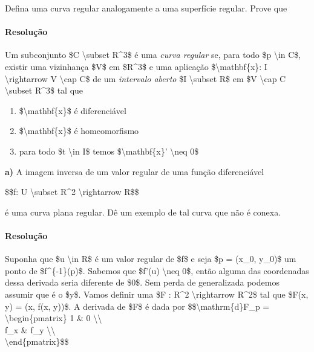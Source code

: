 Defina uma curva regular analogamente a uma superfície regular. Prove
que

\hypertarget{resoluuxe7uxe3o-9}{%
\paragraph{Resolução}\label{resoluuxe7uxe3o-9}}

Um subconjunto \$C \textbackslash{}subset R\^{}3\$ é uma \emph{curva
regular} se, para todo \$p \textbackslash{}in C\$, existir uma
vizinhança \$V\$ em \$R\^{}3\$ e uma aplicação
\$\textbackslash{}mathbf\{x\}: I \textbackslash{}rightarrow V
\textbackslash{}cap C\$ de um \emph{intervalo aberto} \$I
\textbackslash{}subset R\$ em \$V \textbackslash{}cap C
\textbackslash{}subset R\^{}3\$ tal que

\begin{enumerate}
\tightlist
\item
  \$\textbackslash{}mathbf\{x\}\$ é diferenciável
\item
  \$\textbackslash{}mathbf\{x\}\$ é homeomorfismo
\item
  para todo \$t \textbackslash{}in I\$ temos
  \$\textbackslash{}mathbf\{x\}' \textbackslash{}neq 0\$
\end{enumerate}

\textbf{a)} A imagem inversa de um valor regular de uma função
diferenciável

\$\$f: U \textbackslash{}subset R\^{}2 \textbackslash{}rightarrow R\$\$

é uma curva plana regular. Dê um exemplo de tal curva que não é conexa.

\hypertarget{resoluuxe7uxe3o-10}{%
\paragraph{Resolução}\label{resoluuxe7uxe3o-10}}

Suponha que \$u \textbackslash{}in R\$ é um valor regular de \$f\$ e
seja \$p = (x\_0, y\_0)\$ um ponto de \$f\^{}\{-1\}(p)\$. Sabemos que
\$f'(u) \textbackslash{}neq 0\$, então alguma das coordenadas dessa
derivada seria diferente de \$0\$. Sem perda de generalizada podemos
assumir que é o \$y\$. Vamos definir uma \$F : R\^{}2
\textbackslash{}rightarrow R\^{}2\$ tal que \$F(x, y) = (x, f(x, y))\$.
A derivada de \$F\$ é dada por \$\$\textbackslash{}mathrm\{d\}F\_p =
\textbackslash{}begin\{pmatrix\} 1 \& 0
\textbackslash{}\textbackslash{}\\
f\_x \& f\_y \textbackslash{}\textbackslash{}\\
\textbackslash{}end\{pmatrix\}\$\$

